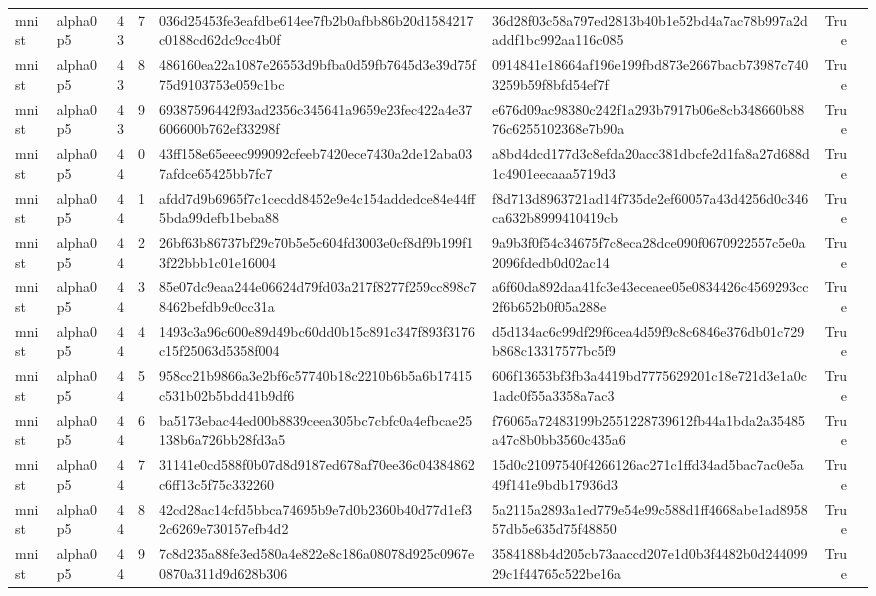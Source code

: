 \begin{tabular}{llrrllrl}
mnist & alpha0p5 & 43 & 7 & 036d25453fe3eafdbe614ee7fb2b0afbb86b20d1584217c0188cd62dc9cc4b0f & 36d28f03c58a797ed2813b40b1e52bd4a7ac78b997a2daddf1bc992aa116c085 & True &  \\
mnist & alpha0p5 & 43 & 8 & 486160ea22a1087e26553d9bfba0d59fb7645d3e39d75f75d9103753e059c1bc & 0914841e18664af196e199fbd873e2667bacb73987c7403259b59f8bfd54ef7f & True &  \\
mnist & alpha0p5 & 43 & 9 & 69387596442f93ad2356c345641a9659e23fec422a4e37606600b762ef33298f & e676d09ac98380c242f1a293b7917b06e8cb348660b8876c6255102368e7b90a & True &  \\
mnist & alpha0p5 & 44 & 0 & 43ff158e65eeec999092cfeeb7420ece7430a2de12aba037afdce65425bb7fc7 & a8bd4dcd177d3c8efda20acc381dbcfe2d1fa8a27d688d1c4901eecaaa5719d3 & True &  \\
mnist & alpha0p5 & 44 & 1 & afdd7d9b6965f7c1cecdd8452e9e4c154addedce84e44ff5bda99defb1beba88 & f8d713d8963721ad14f735de2ef60057a43d4256d0c346ca632b8999410419cb & True &  \\
mnist & alpha0p5 & 44 & 2 & 26bf63b86737bf29c70b5e5c604fd3003e0cf8df9b199f13f22bbb1c01e16004 & 9a9b3f0f54c34675f7c8eca28dce090f0670922557c5e0a2096fdedb0d02ac14 & True &  \\
mnist & alpha0p5 & 44 & 3 & 85e07dc9eaa244e06624d79fd03a217f8277f259cc898c78462befdb9c0cc31a & a6f60da892daa41fc3e43eceaee05e0834426c4569293cc2f6b652b0f05a288e & True &  \\
mnist & alpha0p5 & 44 & 4 & 1493c3a96c600e89d49bc60dd0b15c891c347f893f3176c15f25063d5358f004 & d5d134ac6c99df29f6cea4d59f9c8c6846e376db01c729b868c13317577bc5f9 & True &  \\
mnist & alpha0p5 & 44 & 5 & 958cc21b9866a3e2bf6c57740b18c2210b6b5a6b17415c531b02b5bdd41b9df6 & 606f13653bf3fb3a4419bd7775629201c18e721d3e1a0c1adc0f55a3358a7ac3 & True &  \\
mnist & alpha0p5 & 44 & 6 & ba5173ebac44ed00b8839ceea305bc7cbfc0a4efbcae25138b6a726bb28fd3a5 & f76065a72483199b2551228739612fb44a1bda2a35485a47c8b0bb3560c435a6 & True &  \\
mnist & alpha0p5 & 44 & 7 & 31141e0cd588f0b07d8d9187ed678af70ee36c04384862c6ff13c5f75c332260 & 15d0c21097540f4266126ac271c1ffd34ad5bac7ac0e5a49f141e9bdb17936d3 & True &  \\
mnist & alpha0p5 & 44 & 8 & 42cd28ac14cfd5bbca74695b9e7d0b2360b40d77d1ef32c6269e730157efb4d2 & 5a2115a2893a1ed779e54e99c588d1ff4668abe1ad895857db5e635d75f48850 & True &  \\
mnist & alpha0p5 & 44 & 9 & 7c8d235a88fe3ed580a4e822e8c186a08078d925c0967e0870a311d9d628b306 & 3584188b4d205cb73aaccd207e1d0b3f4482b0d24409929c1f44765c522be16a & True &  \\

\end{tabular}
